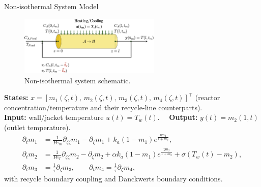 \documentclass[8pt]{beamer}
\begin{document}
\begin{frame}{Non-isothermal System Model}

\begin{figure}
    \centering
    \includegraphics[width=0.6\textwidth]{figures/noniso_reactor.png}\vspace{-2mm}
    \caption{Non-isothermal system schematic.}
\end{figure}

\small
\textbf{States:} $x=[m_1(\zeta,t),\,m_2(\zeta,t),\,m_3(\zeta,t),\,m_4(\zeta,t)]^\top$ (reactor concentration/temperature and their recycle-line counterparts). \\
\textbf{Input:} wall/jacket temperature $u(t)=T_w(t)$. \ \ \textbf{Output:} $y(t)=m_2(1,t)$ (outlet temperature).\\[0.35em]
\begin{align*}
\partial_t m_1 &= \tfrac{1}{Pe_m}\partial_{\zeta\zeta} m_1 - \partial_\zeta m_1 
      + k_a\!\left(1-m_1\right)e^{\frac{\eta m_2}{1+m_2}}, \\
\partial_t m_2 &= \tfrac{1}{Pe_T}\partial_{\zeta\zeta} m_2 - \partial_\zeta m_2 
      + \alpha k_a\!\left(1-m_1\right)e^{\frac{\eta m_2}{1+m_2}} + \sigma\!\left(T_w(t)-m_2\right), \\
\partial_t m_3 &= \tfrac{1}{\tau}\partial_\zeta m_3, \qquad
\partial_t m_4 = \tfrac{1}{\tau}\partial_\zeta m_4,
\end{align*}
with recycle boundary coupling and Danckwerts boundary conditions.
\end{frame}
\end{document}
